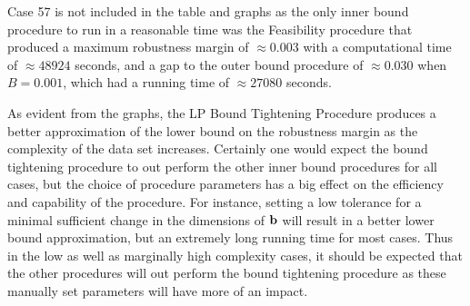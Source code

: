 Case 57 is not included in the table and graphs as the only inner bound procedure to run in a reasonable time was the Feasibility procedure that produced a maximum robustness margin of $\approx 0.003$ with a computational time of $\approx 48924$ seconds, and a gap to the outer bound procedure of $\approx 0.030$ when $B=0.001$, which had a running time of $\approx 27080$ seconds.

As evident from the graphs, the LP Bound Tightening Procedure produces a better approximation of the lower bound on the robustness margin as the complexity of the data set increases. 
Certainly one would expect the bound tightening procedure to out perform the other inner bound procedures for all cases, but the choice of procedure parameters has a big effect on the efficiency and capability of the procedure. 
For instance, setting a low tolerance for a minimal sufficient change in the dimensions of $\mathbf{b}$ will result in a better lower bound approximation, but an extremely long running time for most cases. 
Thus in the low as well as marginally high complexity cases, it should be expected that the other procedures will out perform the bound tightening procedure as these manually set parameters will have more of an impact. 


